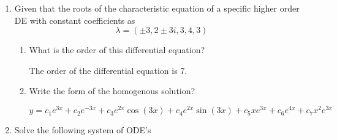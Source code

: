 \documentclass{zc-ust-hw}
\begin{document}
\begin{enumerate}
\begin{enumerate}
\begin{sol}
                Substituting back
                \begin{align}
                  y&= c_{1}u+c_{2}u\ln |u| -\frac{u}{4} \cdot \frac{\ln |\ln^2u +1|}{8} +\frac{u\ln |u|}{4} \tan ^{-1}(\ln ^2u) \\
                  \intertext{Remove absolute values as \(u\) is strictly \( >0 \)}
                  &= c_{1}u+c_{2}u\ln u -\frac{u}{4} \cdot \frac{\ln (\ln^2u +1)}{8} +\frac{u\ln u}{4} \tan ^{-1}(\ln ^2u) \\
                  &= c_{1}u+c_{2}u\ln u-\frac{1}{32}u\ln (\ln^2u+1)-\frac{1}{8}u\ln ^2u+\frac{1}{4}u\ln u\tan ^{-1}(\ln ^2u) \\
                  \intertext{Substitute back \( u=2x-5 \)}
                  \Aboxed{
                  y &= \begin{array}{ll}
                    c_{1}(2x-5)+c_{2}(2x-5)\ln (2x-5) \\
                    -\frac{1}{32}(2x-5)\ln (\ln^2(2x-5)+1) \\
                    -\frac{1}{8}(2x-5)\ln ^2(2x-5) \\
                    +\frac{1}{4}(2x-5)\ln (2x-5)\tan ^{-1}(\ln ^2(2x-5))
                  \end{array}; x>\frac{5}{2}
                  }
                .\end{align}
            \end{sol}
    \end{enumerate}
  \item Given that the roots of the characteristic equation of a specific
    higher order DE with constant coefficients as
    \[
      \lambda = (\pm 3,2\pm 3i,3,4,3)
    \] 
    \begin{enumerate}
      \item What is the order of this differential equation?
        \begin{sol}
          The order of the differential equation is 7.
        \end{sol}
      \item Write the form of the homogenous solution?
        \begin{sol}
          \[
            y = c_1e^{3x} + c_2e^{-3x} + c_3e^{2x}\cos\left( 3x \right) + c_4e^{2x}\sin\left( 3x \right) + c_5xe^{3x} + c_6e^{4x} + c_7x^2e^{3x}
          \]
        \end{sol}
    \end{enumerate}
    \newpage
  \item Solve the following system of ODE's

\end{enumerate}
\end{document}
